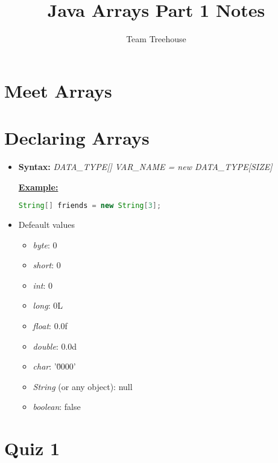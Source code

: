\documentclass[12pt]{article}
\begin{document}
\title{Java Arrays Part 1 Notes}
\author{Team Treehouse}
\maketitle

\section{Meet Arrays}

\bigskip

\section{Declaring Arrays}

\bigskip

\begin{itemize}
    \item \textbf{Syntax:} \textit{DATA\_TYPE[] VAR\_NAME = new DATA\_TYPE[SIZE]}

    \bigskip

    \underline{\textbf{Example:}}

    \bigskip

    \begin{lstlisting}[language=Java]
    String[] friends = new String[3];
    \end{lstlisting}

    \item Defeault values
    \begin{itemize}
        \item \textit{byte}: 0
        \item \textit{short}: 0
        \item \textit{int}: 0
        \item \textit{long}: 0L
        \item \textit{float}: 0.0f
        \item \textit{double}: 0.0d
        \item \textit{char}: '\u0000'
        \item \textit{String} (or any object): null
        \item \textit{boolean}: false
    \end{itemize}
\end{itemize}

\bigskip

\section{Quiz 1}
\end{document}
